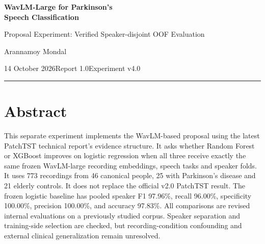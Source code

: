 \documentclass[11pt,a4paper]{article}
\begin{document}
\begin{center}{\LARGE\bfseries WavLM-Large for Parkinson's\\Speech Classification}\par\vspace{10pt}
{\large Proposal Experiment: Verified Speaker-disjoint OOF Evaluation}\par
Arannamoy Mondal\par 14 October 2026\quad Report 1.0\quad Experiment v4.0\end{center}\hrule
\section*{Abstract}
This separate experiment implements the WavLM-based proposal using the latest
PatchTST technical report's evidence structure. It asks whether Random Forest
or XGBoost improves on logistic regression when all three receive exactly the
same frozen WavLM-large recording embeddings, speech tasks and speaker folds.
It uses 773 recordings from 46 canonical people, 25 with Parkinson's disease
and 21 elderly controls. It does not replace the official v2.0 PatchTST result.
The frozen logistic baseline has pooled speaker F1 97.96\%, recall 96.00\%, specificity 100.00\%, precision 100.00\%, and accuracy 97.83\%.
All comparisons are revised internal evaluations on a previously studied corpus.
Speaker separation and training-side selection are checked, but recording-condition
confounding and external clinical generalization remain unresolved.
\end{document}

